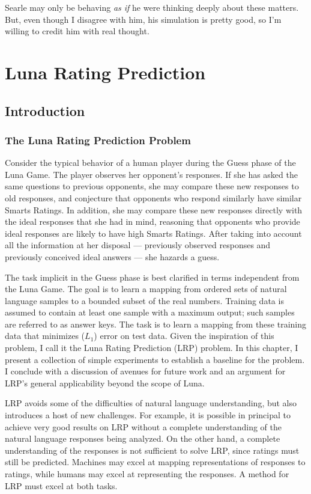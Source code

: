 \begin{savequote}[75mm]
Searle may only be behaving \textit{as if} he were thinking deeply about these matters. But, even though I disagree with him, his simulation is pretty good, so I'm willing to credit him with real thought.
\end{savequote}

\chapter{Luna Rating Prediction}

\section{Introduction}
\subsection{The Luna Rating Prediction Problem}
Consider the typical behavior of a human player during the Guess phase of the Luna Game. The player observes her opponent's responses. If she has asked the same questions to previous opponents, she may compare these new responses to old responses, and conjecture that opponents who respond similarly have similar Smarts Ratings. In addition, she may compare these new responses directly with the ideal responses that she had in mind, reasoning that opponents who provide ideal responses are likely to have high Smarts Ratings. After taking into account all the information at her disposal --- previously observed responses and previously conceived ideal answers --- she hazards a guess.

The task implicit in the Guess phase is best clarified in terms independent from the Luna Game. The goal is to learn a mapping from ordered sets of natural language samples to a bounded subset of the real numbers. Training data is assumed to contain at least one sample with a maximum output; such samples are referred to as answer keys. The task is to learn a mapping from these training data that minimizes ($L_1$) error on test data. Given the inspiration of this problem, I call it the Luna Rating Prediction (LRP) problem. In this chapter, I present a collection of simple experiments to establish a baseline for the problem. I conclude with a discussion of avenues for future work and an argument for LRP's general applicability beyond the scope of Luna.

LRP avoids some of the difficulties of natural language understanding, but also introduces a host of new challenges. For example, it is possible in principal to achieve very good results on LRP without a complete understanding of the natural language responses being analyzed. On the other hand, a complete understanding of the responses is not sufficient to solve LRP, since ratings must still be predicted. Machines may excel at mapping representations of responses to ratings, while humans may excel at representing the responses. A method for LRP must excel at both tasks.


